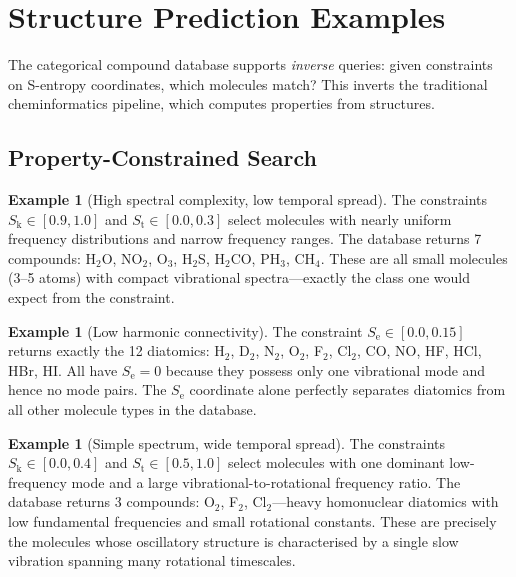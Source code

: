 \documentclass[11pt,a4paper]{article}
\theoremstyle{definition}
\newtheorem{example}[theorem]{Example}
\theoremstyle{remark}
\newcommand{\Sk}{S_{\mathrm{k}}}
\newcommand{\St}{S_{\mathrm{t}}}
\newcommand{\Se}{S_{\mathrm{e}}}
\begin{document}
\section{Structure Prediction Examples}
\label{sec:prediction}

The categorical compound database supports \emph{inverse} queries: given constraints on S-entropy coordinates, which molecules match? This inverts the traditional cheminformatics pipeline, which computes properties from structures.

\subsection{Property-Constrained Search}

\begin{example}[High spectral complexity, low temporal spread]
The constraints $\Sk \in [0.9, 1.0]$ and $\St \in [0.0, 0.3]$ select molecules with nearly uniform frequency distributions and narrow frequency ranges. The database returns 7 compounds: H$_2$O, NO$_2$, O$_3$, H$_2$S, H$_2$CO, PH$_3$, CH$_4$. These are all small molecules (3--5 atoms) with compact vibrational spectra---exactly the class one would expect from the constraint.
\end{example}

\begin{example}[Low harmonic connectivity]
The constraint $\Se \in [0.0, 0.15]$ returns exactly the 12 diatomics: H$_2$, D$_2$, N$_2$, O$_2$, F$_2$, Cl$_2$, CO, NO, HF, HCl, HBr, HI. All have $\Se = 0$ because they possess only one vibrational mode and hence no mode pairs. The $\Se$ coordinate alone perfectly separates diatomics from all other molecule types in the database.
\end{example}

\begin{example}[Simple spectrum, wide temporal spread]
The constraints $\Sk \in [0.0, 0.4]$ and $\St \in [0.5, 1.0]$ select molecules with one dominant low-frequency mode and a large vibrational-to-rotational frequency ratio. The database returns 3 compounds: O$_2$, F$_2$, Cl$_2$---heavy homonuclear diatomics with low fundamental frequencies and small rotational constants. These are precisely the molecules whose oscillatory structure is characterised by a single slow vibration spanning many rotational timescales.
\end{example}
\end{document}
